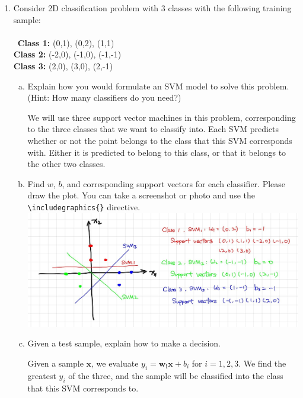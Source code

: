\documentclass[11pt]{article}
\renewcommand{\vec}[1]{\mathbf{#1}}
\begin{document}
\begin{enumerate}

\item Consider 2D classification problem with 3 classes with the following training sample:\\\\\
\textbf{Class 1:} (0,1), (0,2), (1,1)\\
\textbf{Class 2:} (-2,0), (-1,0), (-1,-1)\\
\textbf{Class 3:} (2,0), (3,0), (2,-1)\\
\begin{enumerate}[(a)]
    \item 
    Explain how you would formulate an SVM model to solve this problem. (Hint: How many classifiers do you need?)\\

\begin{answertext}{5cm}{}  

We will use three support vector machines in this problem, corresponding to the three classes that we want to classify into. Each SVM predicts whether or not the point belongs to the class that this SVM corresponds with. Either it is predicted to belong to this class, or that it belongs to the other two classes.

\end{answertext} 
    \item
    Find $w$, $b$, and corresponding support vectors for each classifier. Please draw the plot.  You can take a screenshot or photo and use the \texttt{{\textbackslash}includegraphics\{\}} directive.\\
\includegraphics[scale=0.25]{p2.2.jpg}
    \item
    Given a test sample, explain how to make a decision.\\

\begin{answertext}{5cm}{}

Given a sample $\vec{x}$, we evaluate $y_{i} = \vec{w_{i}}\vec{x} + b_{i}$ for $i = 1, 2, 3$. We find the greatest $y_{i}$ of the three, and the sample will be classified into the class that this SVM corresponds to.

\end{answertext} 
\end{enumerate}

\end{enumerate}
\end{document}
